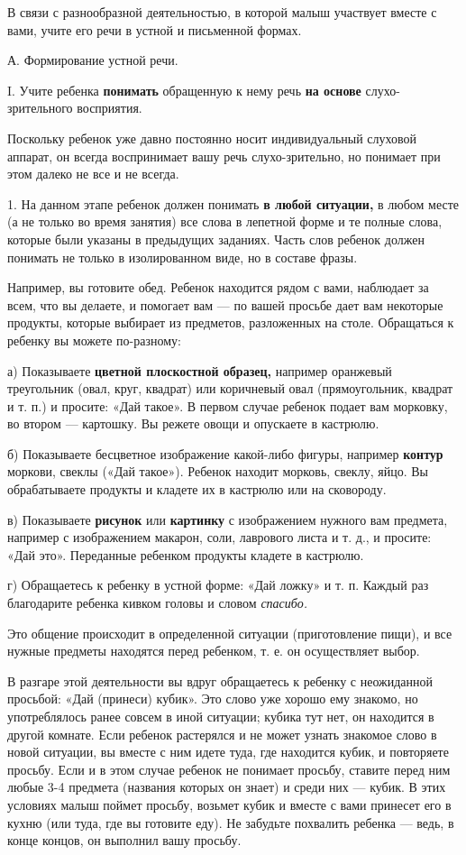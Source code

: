 \documentclass[a5paper]{book}
\renewcommand{\emph}[1]{\textit{#1}}
\begin{document}
В связи с разнообразной деятельностью, в которой малыш участвует вместе
с вами, учите его речи в устной и письменной формах.

А. Формирование устной речи.

I. Учите ребенка \textbf{понимать} обращенную к нему речь \textbf{на
основе} слухо-зрительного восприятия.

Поскольку ребенок уже давно постоянно носит индивидуальный слуховой
аппарат, он всегда воспринимает вашу речь слухо-зрительно, но понимает
при этом далеко не все и не всегда.

1. На данном этапе ребенок должен понимать \textbf{в любой ситуации,} в
любом месте (а не только во время занятия) все слова в лепетной форме и
те полные слова, которые были указаны в предыдущих заданиях. Часть слов
ребенок должен понимать не только в изолированном виде, но в составе
фразы.

Например, вы готовите обед. Ребенок находится рядом с вами, наблюдает за
всем, что вы делаете, и помогает вам --- по вашей просьбе дает вам
некоторые продукты, которые выбирает из предметов, разложенных на столе.
Обращаться к ребенку вы можете по-разному:

а) Показываете \textbf{цветной плоскостной образец,} например оранжевый
треугольник (овал, круг, квадрат) или коричневый овал (прямоугольник,
квадрат и т. п.) и просите: «Дай такое». В первом случае ребенок подает
вам морковку, во втором --- картошку. Вы режете овощи и опускаете в
кастрюлю.

б) Показываете бесцветное изображение какой-либо фигуры, например
\textbf{контур} моркови, свеклы («Дай такое»). Ребенок находит морковь,
свеклу, яйцо. Вы обрабатываете продукты и кладете их в кастрюлю или на
сковороду.

в) Показываете \textbf{рисунок} или \textbf{картинку} с изображением
нужного вам предмета, например с изображением макарон, соли, лаврового
листа и т. д., и просите: «Дай это». Переданные ребенком продукты
кладете в кастрюлю.

г) Обращаетесь к ребенку в устной форме: «Дай ложку» и т. п. Каждый раз
благодарите ребенка кивком головы и словом \emph{спасибо.}

Это общение происходит в определенной ситуации (приготовление пищи), и
все нужные предметы находятся перед ребенком, т. е. он осуществляет
выбор.

В разгаре этой деятельности вы вдруг обращаетесь к ребенку с неожиданной
просьбой: «Дай (принеси) кубик». Это слово уже хорошо ему знакомо, но
употреблялось ранее совсем в иной ситуации; кубика тут нет, он находится
в другой комнате. Если ребенок растерялся и не может узнать знакомое
слово в новой ситуации, вы вместе с ним идете туда, где находится кубик,
и повторяете просьбу. Если и в этом случае ребенок не понимает просьбу,
ставите перед ним любые 3-4 предмета (названия которых он знает) и среди
них --- кубик. В этих условиях малыш поймет просьбу, возьмет кубик и
вместе с вами принесет его в кухню (или туда, где вы готовите еду). Не
забудьте похвалить ребенка --- ведь, в конце концов, он выполнил вашу
просьбу.
\end{document}
